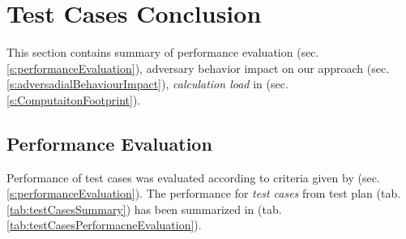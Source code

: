 \cleardoublepage
\section{Test Cases Conclusion}\label{s:testCasesConclusion}
\noindent This section contains summary of performance evaluation (sec. \ref{s:performanceEvaluation}), adversary behavior impact on our approach (sec. \ref{s:adversadialBehaviourImpact}), \emph{calculation load} in (sec. \ref{s:ComputaitonFootprint}).

\subsection{Performance Evaluation}\label{s:performanceEvaluationTable}
\noindent Performance of test cases was evaluated according to criteria given by (sec. \ref{s:performanceEvaluation}). The performance for \emph{test cases} from test plan (tab. \ref{tab:testCasesSummary}) has been summarized in (tab. \ref{tab:testCasesPerformacneEvaluation}).

